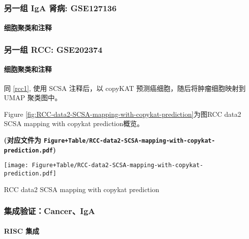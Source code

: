 \documentclass[
]{article}
\begin{document}
\hypertarget{ux53e6ux4e00ux7ec4-iga-ux80beux75c5-gse127136}{%
\subsubsection{另一组 IgA 肾病: GSE127136}\label{ux53e6ux4e00ux7ec4-iga-ux80beux75c5-gse127136}}

\hypertarget{ux7ec6ux80deux805aux7c7bux548cux6ce8ux91ca-5}{%
\paragraph{细胞聚类和注释}\label{ux7ec6ux80deux805aux7c7bux548cux6ce8ux91ca-5}}

\hypertarget{ux53e6ux4e00ux7ec4-rcc-gse202374}{%
\subsubsection{另一组 RCC: GSE202374}\label{ux53e6ux4e00ux7ec4-rcc-gse202374}}

\hypertarget{ux7ec6ux80deux805aux7c7bux548cux6ce8ux91ca-6}{%
\paragraph{细胞聚类和注释}\label{ux7ec6ux80deux805aux7c7bux548cux6ce8ux91ca-6}}

同 \ref{rcc1}, 使用 SCSA 注释后，以 copyKAT 预测癌细胞，随后将肿瘤细胞映射到 UMAP 聚类图中。

Figure \ref{fig:RCC-data2-SCSA-mapping-with-copykat-prediction}为图RCC data2 SCSA mapping with copykat prediction概览。

\textbf{(对应文件为 \texttt{Figure+Table/RCC-data2-SCSA-mapping-with-copykat-prediction.pdf})}

\def\@captype{figure}
\begin{center}
\texttt{[image: Figure+Table/RCC-data2-SCSA-mapping-with-copykat-prediction.pdf]}
\caption{RCC data2 SCSA mapping with copykat prediction}\label{fig:RCC-data2-SCSA-mapping-with-copykat-prediction}
\end{center}

\hypertarget{ux96c6ux6210ux9a8cux8bc1canceriga}{%
\subsubsection{集成验证：Cancer、IgA}\label{ux96c6ux6210ux9a8cux8bc1canceriga}}

\hypertarget{risc-ux96c6ux6210}{%
\paragraph{RISC 集成}\label{risc-ux96c6ux6210}}
\end{document}
